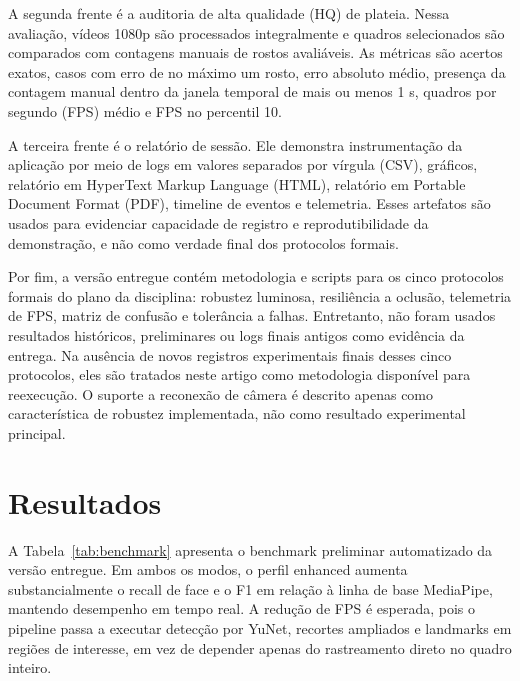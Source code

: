\documentclass[12pt]{article}
\begin{document}
A segunda frente é a auditoria de alta qualidade (HQ) de plateia. Nessa avaliação, vídeos 1080p são processados integralmente e quadros selecionados são comparados com contagens manuais de rostos avaliáveis. As métricas são acertos exatos, casos com erro de no máximo um rosto, erro absoluto médio, presença da contagem manual dentro da janela temporal de mais ou menos 1 s, quadros por segundo (FPS) médio e FPS no percentil 10.

A terceira frente é o relatório de sessão. Ele demonstra instrumentação da aplicação por meio de logs em valores separados por vírgula (CSV), gráficos, relatório em HyperText Markup Language (HTML), relatório em Portable Document Format (PDF), timeline de eventos e telemetria. Esses artefatos são usados para evidenciar capacidade de registro e reprodutibilidade da demonstração, e não como verdade final dos protocolos formais.

Por fim, a versão entregue contém metodologia e scripts para os cinco protocolos formais do plano da disciplina: robustez luminosa, resiliência a oclusão, telemetria de FPS, matriz de confusão e tolerância a falhas. Entretanto, não foram usados resultados históricos, preliminares ou logs finais antigos como evidência da entrega. Na ausência de novos registros experimentais finais desses cinco protocolos, eles são tratados neste artigo como metodologia disponível para reexecução. O suporte a reconexão de câmera é descrito apenas como característica de robustez implementada, não como resultado experimental principal.

\section{Resultados}

A Tabela~\ref{tab:benchmark} apresenta o benchmark preliminar automatizado da versão entregue. Em ambos os modos, o perfil enhanced aumenta substancialmente o recall de face e o F1 em relação à linha de base MediaPipe, mantendo desempenho em tempo real. A redução de FPS é esperada, pois o pipeline passa a executar detecção por YuNet, recortes ampliados e landmarks em regiões de interesse, em vez de depender apenas do rastreamento direto no quadro inteiro.
\end{document}
